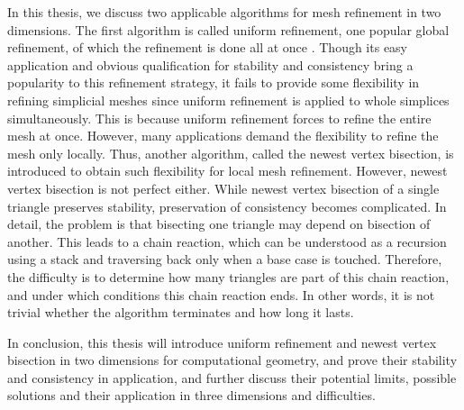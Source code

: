 In this thesis, we discuss two applicable algorithms for mesh refinement in two dimensions. The first algorithm is called uniform refinement, one popular global refinement, of which the refinement is done all at once \cite{bank1983some,Bey1995,bey2000simplicial}. Though its easy application and obvious qualification for stability and consistency bring a popularity to this refinement strategy, it fails to provide some flexibility in refining simplicial meshes since uniform refinement is applied to whole simplices simultaneously. This is because uniform refinement forces to refine the entire mesh at once. However, many applications demand the flexibility to refine the mesh only locally. Thus, another algorithm, called the newest vertex bisection, is introduced to obtain such flexibility for local mesh refinement. However, newest vertex bisection is not perfect either. While newest vertex bisection of a single triangle preserves stability, preservation of consistency becomes complicated. In detail, the problem is that bisecting one triangle may depend on bisection of another. This leads to a chain reaction, which can be understood as a recursion using a stack and traversing back only when a base case is touched. Therefore, the difficulty is to determine how many triangles are part of this chain reaction, and under which conditions this chain reaction ends. In other words, it is not trivial whether the algorithm terminates and how long it lasts. 

In conclusion, this thesis will introduce uniform refinement and newest vertex bisection in two dimensions for computational geometry, and prove their stability and consistency in application, and further discuss their potential limits, possible solutions and their application in three dimensions and difficulties.

